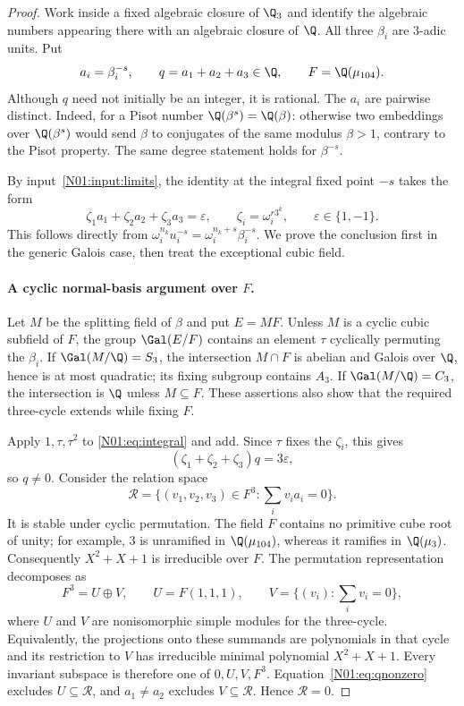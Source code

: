 \documentclass[11pt,a4paper]{article}
\theoremstyle{definition}\newtheorem{definition}[theorem]{Definition}
\theoremstyle{remark}\newtheorem{remark}[theorem]{Remark}
\begin{document}
\begin{proof}
Work inside a fixed algebraic closure of $\Q_3$ and identify the
algebraic numbers appearing there with an algebraic closure of $\Q$.
All three $\beta_i$ are $3$-adic units. Put
\[
 a_i=\beta_i^{-s},\qquad q=a_1+a_2+a_3\in\Q,
 \qquad F=\Q(\mu_{104}).
\]
Although $q$ need not initially be an integer, it is rational.
The $a_i$ are pairwise distinct. Indeed, for a Pisot number
$\Q(\beta^s)=\Q(\beta)$: otherwise two embeddings over
$\Q(\beta^s)$ would send $\beta$ to conjugates of the same modulus
$\beta>1$, contrary to the Pisot property. The same degree statement
holds for $\beta^{-s}$.

By input~\ref{N01:input:limits}, the identity at the integral fixed point
$-s$ takes the form
\begin{equation}\label{N01:eq:integral}
 \zeta_1a_1+\zeta_2a_2+\zeta_3a_3=\varepsilon,
 \qquad \zeta_i=\omega_i^{r3^k},\qquad \varepsilon\in\{1,-1\}.
\end{equation}
This follows directly from
$\omega_i^{n_k}u_i^{-s}=\omega_i^{n_k+s}\beta_i^{-s}$.
We prove the conclusion first in the generic Galois case, then treat
the exceptional cubic field.

\paragraph{A cyclic normal-basis argument over $F$.}
Let $M$ be the splitting field of $\beta$ and put $E=MF$.
Unless $M$ is a cyclic cubic subfield of $F$, the group
$\Gal(E/F)$ contains an element $\tau$ cyclically permuting the
$\beta_i$. If $\Gal(M/\Q)=S_3$, the intersection $M\cap F$ is
abelian and Galois over $\Q$, hence is at most quadratic; its fixing
subgroup contains $A_3$. If $\Gal(M/\Q)=C_3$, the intersection is
$\Q$ unless $M\subseteq F$. These assertions also show that the
required three-cycle extends while fixing $F$.

Apply $1,\tau,\tau^2$ to \eqref{N01:eq:integral} and add. Since $\tau$
fixes the $\zeta_i$, this gives
\begin{equation}\label{N01:eq:qnonzero}
 (\zeta_1+\zeta_2+\zeta_3)q=3\varepsilon,
\end{equation}
so $q\ne0$. Consider the relation space
\[
 \mathcal R=\{(v_1,v_2,v_3)\in F^3:\textstyle\sum_i v_i a_i=0\}.
\]
It is stable under cyclic permutation. The field $F$ contains no
primitive cube root of unity; for example, $3$ is unramified in
$\Q(\mu_{104})$, whereas it ramifies in $\Q(\mu_3)$.
Consequently $X^2+X+1$ is irreducible over $F$. The permutation
representation decomposes as
\[
 F^3=U\oplus V,\qquad
 U=F(1,1,1),\qquad V=\{(v_i):\textstyle\sum_i v_i=0\},
\]
where $U$ and $V$ are nonisomorphic simple modules for the three-cycle.
Equivalently, the projections onto these summands are polynomials in
that cycle and its restriction to $V$ has irreducible minimal
polynomial $X^2+X+1$. Every invariant subspace is therefore one of
$0,U,V,F^3$. Equation~\eqref{N01:eq:qnonzero} excludes $U\subseteq\mathcal R$,
and $a_1\ne a_2$ excludes $V\subseteq\mathcal R$. Hence
$\mathcal R=0$.


\end{proof}
\end{document}
